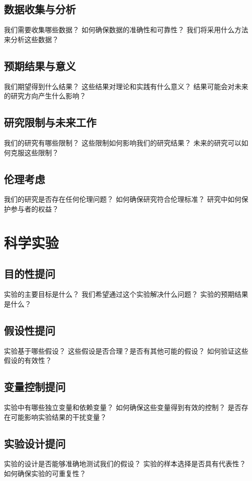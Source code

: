 \documentclass[12pt]{book}
\begin{document}
\subsection{数据收集与分析}
我们需要收集哪些数据？
如何确保数据的准确性和可靠性？
我们将采用什么方法来分析这些数据？

\subsection{预期结果与意义}
我们期望得到什么结果？
这些结果对理论和实践有什么意义？
结果可能会对未来的研究方向产生什么影响？

\subsection{研究限制与未来工作}
我们的研究有哪些限制？
这些限制如何影响我们的研究结果？
未来的研究可以如何克服这些限制？

\subsection{伦理考虑}
我们的研究是否存在任何伦理问题？
如何确保研究符合伦理标准？
研究中如何保护参与者的权益？


\section{科学实验}
\subsection{目的性提问}
实验的主要目标是什么？
我们希望通过这个实验解决什么问题？
实验的预期结果是什么？
\subsection{假设性提问}
实验基于哪些假设？
这些假设是否合理？是否有其他可能的假设？
如何验证这些假设的有效性？

\subsection{变量控制提问}
实验中有哪些独立变量和依赖变量？
如何确保这些变量得到有效的控制？
是否存在可能影响实验结果的干扰变量？

\subsection{实验设计提问}
实验的设计是否能够准确地测试我们的假设？
实验的样本选择是否具有代表性？
如何确保实验的可重复性？
\end{document}
